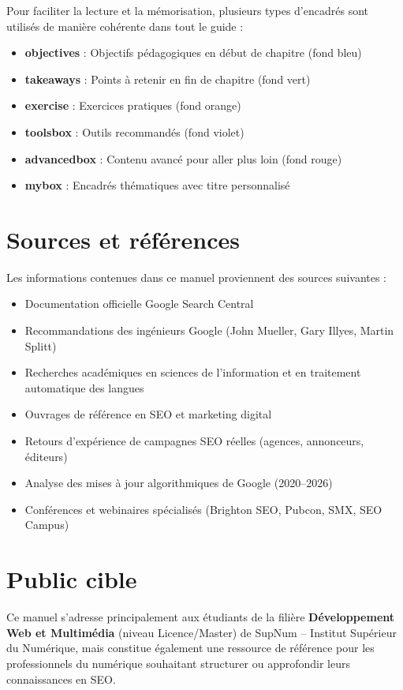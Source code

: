 \documentclass[12pt,a4paper,twoside]{report}
\newcommand{\keyword}[1]{\textbf{\textcolor{googleblue}{#1}}}
\begin{document}
Pour faciliter la lecture et la mémorisation, plusieurs types d'encadrés sont utilisés de manière cohérente dans tout le guide :

\begin{itemize}
    \item \keyword{objectives} : Objectifs pédagogiques en début de chapitre (fond bleu)
    \item \keyword{takeaways} : Points à retenir en fin de chapitre (fond vert)
    \item \keyword{exercise} : Exercices pratiques (fond orange)
    \item \keyword{toolsbox} : Outils recommandés (fond violet)
    \item \keyword{advancedbox} : Contenu avancé pour aller plus loin (fond rouge)
    \item \keyword{mybox} : Encadrés thématiques avec titre personnalisé
\end{itemize}

\section*{Sources et références}

Les informations contenues dans ce manuel proviennent des sources suivantes :
\begin{itemize}
    \item Documentation officielle Google Search Central
    \item Recommandations des ingénieurs Google (John Mueller, Gary Illyes, Martin Splitt)
    \item Recherches académiques en sciences de l'information et en traitement automatique des langues
    \item Ouvrages de référence en SEO et marketing digital
    \item Retours d'expérience de campagnes SEO réelles (agences, annonceurs, éditeurs)
    \item Analyse des mises à jour algorithmiques de Google (2020--2026)
    \item Conférences et webinaires spécialisés (Brighton SEO, Pubcon, SMX, SEO Campus)
\end{itemize}

\section*{Public cible}
Ce manuel s'adresse principalement aux étudiants de la filière \keyword{Développement Web et Multimédia} (niveau Licence/Master) de SupNum -- Institut Supérieur du Numérique, mais constitue également une ressource de référence pour les professionnels du numérique souhaitant structurer ou approfondir leurs connaissances en SEO.
\end{document}
